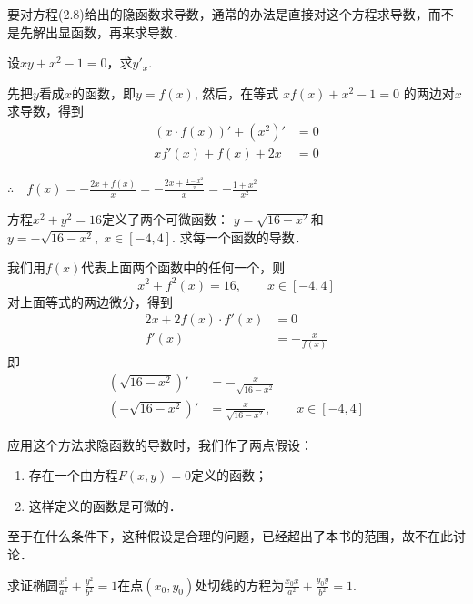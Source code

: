 要对方程(2.8)给出的隐函数求导数，通常的办法是直接对这个方程求导数，而不是先解出显函数，再来求导数．


\begin{example}
设$xy+x^2-1=0$，求$y'_x$.
\end{example}

\begin{solution}
先把$y$看成$x$的函数，即$y=f(x)$, 然后，在等式
$xf (x) +x^2-1=0$
的两边对$x$求导数，得到
\begin{align*}
    (x\cdot f(x))'+(x^2)'&=0\\
xf'(x)+f(x)+2x&=0
\end{align*}

$\therefore\quad f (x) =-\frac{2x+f (x)}{x}=-\frac{2x+\frac{1-x^2}{x}}{x}=-\frac{1+x^2}{x^2}$    
\end{solution}

\begin{example}
    方程$x^2+y^2=16$定义了两个可微函数：
$y=\sqrt{16-x^2}$和$y=-\sqrt{16-x^2},\; x\in [-4, 4]$. 求每一个函数的导数．
\end{example}


\begin{solution}
    我们用$f(x)$代表上面两个函数中的任何一个，则
\[x^2+f^2 (x) =16,\qquad  x\in  [-4, 4] \]
对上面等式的两边微分，得到
\begin{align*}
    2x+2f (x) \cdot f' (x) &=0\\
    f'(x)&=-\frac{x}{f(x)}
\end{align*}
即
\begin{align*}
    \left(\sqrt{16-x^2}\right)'&=-\frac{x}{\sqrt{16-x^2}}\\
    \left(-\sqrt{16-x^2}\right)'&=\frac{x}{\sqrt{16-x^2}},\qquad x\in[-4,4]
\end{align*}
\end{solution}

\begin{rmk}
应用这个方法求隐函数的导数时，我们作了两点假设：
\begin{enumerate}
    \item 存在一个由方程$F(x,y)=0$定义的函数；
    \item 这样定义的函数是可微的．
\end{enumerate} 
至于在什么条件下，这种假设是合理的问题，已经超出了本书的范围，故不在此讨论．
\end{rmk}

\begin{example}
求证椭圆$\frac{x^2}{a^2}+\frac{y^2}{b^2}=1$在点$(x_0,y_0)$处切线的方程为$\frac{x_0x}{a^2}+\frac{y_0y}{b^2}=1$.
\end{example}

